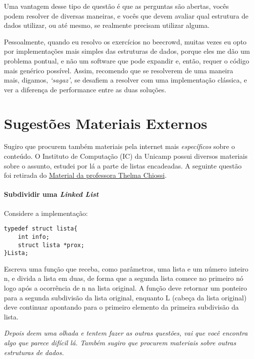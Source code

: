 \documentclass[a4paper]{article}
\begin{document}
    Uma vantagem desse tipo de questão é que as perguntas são abertas, vocês
    podem resolver de diversas maneiras, e vocês que devem avaliar qual
    estrutura de dados utilizar, ou até mesmo, se realmente precisam utilizar
    alguma.

    Pessoalmente, quando eu resolvo os exercícios no beecrowd, muitas vezes eu
    opto por implementações mais simples das estruturas de dados, porque eles me
    dão um problema pontual, e não um software que pode expandir e, então,
    requer o código mais genérico possível. Assim, recomendo que se resolverem
    de uma maneira mais, digamos, \textit{`sagaz'}, se desafiem a resolver com uma
    implementação clássica, e ver a diferença de performance entre as duas
    soluções.
    \section*{Sugestões Materiais Externos}
    Sugiro que procurem também materiais pela internet mais \emph{específicos} sobre o
    conteúdo. O Instituto de Computação (IC) da Unicamp possui diversos
    materiais sobre o assunto, estudei por lá a parte de listas encadeadas.  A
    seguinte questão foi retirada do
    \href{https://www.ic.unicamp.br/~thelma/gradu/MC102/Turma-2008S2/Listas-exercicios/Lista6_exerc.pdf}{Material
    da professora Thelma Chiossi}. 

    \paragraph{Subdividir uma \textit{Linked List}\\}
    Considere a implementação:

    \begin{tcolorbox}
        \begin{verbatim}
typedef struct lista{
    int info;
    struct lista *prox;
}Lista;
        \end{verbatim}
    \end{tcolorbox}
    Escreva uma função que receba, como parâmetros, uma lista e um número inteiro n,
e divida a lista em duas, de forma que a segunda lista comece no primeiro nó logo
após a ocorrência de n na lista original. A função deve retornar um ponteiro para a
segunda subdivisão da lista original, enquanto L (cabeça da lista original) deve
continuar apontando para o primeiro elemento da primeira subdivisão da lista.

    \textit{ Depois deem uma olhada e tentem fazer as outras questões, vai que você
    encontra algo que parece difícil lá. Também sugiro que procurem materiais
    sobre outras estruturas de dados.}
\end{document}
